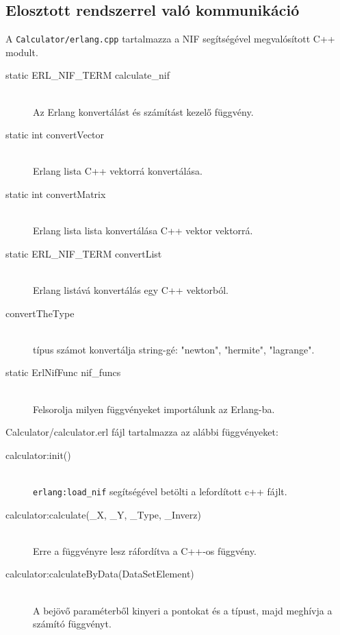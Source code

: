\subsection{Elosztott rendszerrel való kommunikáció} 
	A \texttt{Calculator/erlang.cpp} tartalmazza a NIF segítségével megvalósított C++ modult.
	\begin{description}
		\item[static ERL\_NIF\_TERM calculate\_nif] \hfill \\
		Az Erlang konvertálást és számítást kezelő függvény. 
		\item[static int convertVector] \hfill \\
		Erlang lista C++ vektorrá konvertálása.
		\item[static int convertMatrix] \hfill \\
		Erlang lista lista konvertálása C++ vektor vektorrá.
		\item[static ERL\_NIF\_TERM convertList] \hfill \\
		Erlang listává konvertálás egy C++ vektorból.
		\item[convertTheType] \hfill \\
			típus számot konvertálja string-gé: 
			"newton", "hermite", "lagrange".
		\item[static ErlNifFunc nif\_funcs] \hfill \\
			Felsorolja milyen függvényeket importálunk az Erlang-ba.
	\end{description}
	Calculator/calculator.erl fájl tartalmazza az alábbi függvényeket: 
	\begin{description}
		\item[calculator:init()] \hfill \\
			\texttt{erlang:load\_nif} segítségével betölti a lefordított c++ fájlt.
		\item[calculator:calculate(\_X, \_Y, \_Type, \_Inverz)] \hfill \\
			Erre a függvényre lesz ráfordítva a C++-os függvény.
		\item[calculator:calculateByData(DataSetElement)] \hfill \\
		A bejövő paraméterből kinyeri a pontokat és a típust, majd meghívja a számító függvényt.
	\end{description}